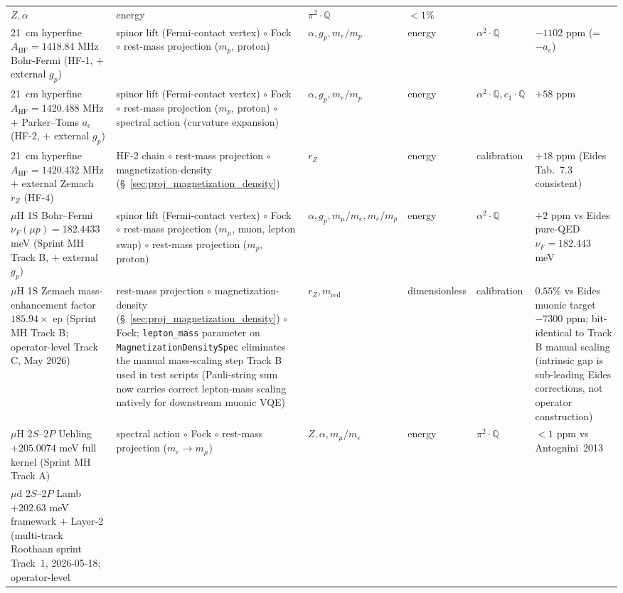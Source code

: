 \documentclass[11pt]{article}
\begin{document}
\begin{longtable}{p{3.5cm} p{2.8cm} p{1.3cm} p{2.2cm} p{1.8cm} p{1.4cm}}
$Z, \alpha$ & energy & $\pi^2{\cdot}\mathbb{Q}$ & $<1\%$ \\
21~cm hyperfine $A_\text{HF} = 1418.84$ MHz Bohr-Fermi (HF-1, $+$ external
$g_p$) & spinor lift (Fermi-contact vertex) $\circ$ Fock $\circ$ rest-mass
projection ($m_p$, proton) & $\alpha, g_p, m_e/m_p$ & energy &
$\alpha^2{\cdot}\mathbb{Q}$ & $-1102$ ppm (= $-a_e$) \\
21~cm hyperfine $A_\text{HF} = 1420.488$ MHz $+$ Parker--Toms $a_e$
(HF-2, $+$ external $g_p$) & spinor lift (Fermi-contact vertex) $\circ$
Fock $\circ$ rest-mass projection ($m_p$, proton) $\circ$ spectral
action (curvature expansion) & $\alpha, g_p, m_e/m_p$ & energy &
$\alpha^2{\cdot}\mathbb{Q}, c_1 \cdot \mathbb{Q}$ & $+58$ ppm \\
21~cm hyperfine $A_\text{HF} = 1420.432$ MHz $+$ external Zemach $r_Z$
(HF-4) & HF-2 chain $\circ$ rest-mass projection $\circ$
magnetization-density (\S~\ref{sec:proj_magnetization_density}) &
$r_Z$ & energy & calibration & $+18$ ppm (Eides Tab.~7.3 consistent) \\
$\mu$H 1S Bohr--Fermi $\nu_F(\mu p) = 182.4433$ meV (Sprint MH Track B,
$+$ external $g_p$) & spinor lift (Fermi-contact vertex) $\circ$ Fock
$\circ$ rest-mass projection ($m_\mu$, muon, lepton swap) $\circ$
rest-mass projection ($m_p$, proton) & $\alpha, g_p, m_\mu/m_e, m_e/m_p$
& energy & $\alpha^2 \cdot \mathbb{Q}$ &
$+2$ ppm vs Eides pure-QED $\nu_F = 182.443$ meV \\
$\mu$H 1S Zemach mass-enhancement factor $185.94 \times$ ep
(Sprint MH Track B; operator-level Track C, May 2026) & rest-mass
projection $\circ$ magnetization-density
(\S~\ref{sec:proj_magnetization_density}) $\circ$ Fock; \texttt{lepton\_mass}
parameter on \texttt{MagnetizationDensitySpec} eliminates the manual
mass-scaling step Track B used in test scripts (Pauli-string sum now
carries correct lepton-mass scaling natively for downstream muonic
VQE) & $r_Z, m_\text{red}$ & dimensionless & calibration &
$0.55\%$ vs Eides muonic target $-7300$ ppm; bit-identical to Track B
manual scaling (intrinsic gap is sub-leading Eides corrections, not
operator construction) \\
$\mu$H 2$S$--2$P$ Uehling $+205.0074$ meV full kernel
(Sprint MH Track A) & spectral action $\circ$ Fock $\circ$ rest-mass
projection ($m_e \to m_\mu$) & $Z, \alpha, m_\mu/m_e$ & energy &
$\pi^2{\cdot}\mathbb{Q}$ & $<1$ ppm vs Antognini~2013 \\
$\mu$d 2$S$--2$P$ Lamb $+202.63$ meV framework $+$ Layer-2
(multi-track Roothaan sprint Track~1, 2026-05-18; operator-level

\end{longtable}
\end{document}
